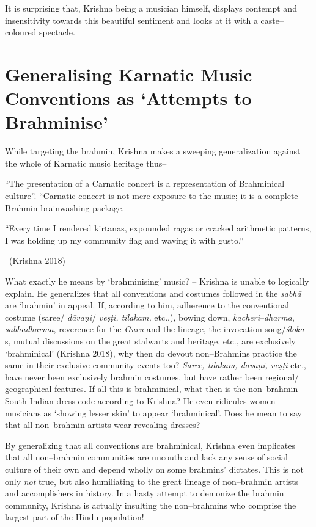 It is surprising that, Krishna being a musician himself, displays contempt and insensitivity towards this beautiful sentiment and looks at it with a caste–coloured spectacle.


\section*{Generalising Karnatic Music Conventions as ‘Attempts to Brahminise’}

While targeting the brahmin, Krishna makes a sweeping generalization against the whole of Karnatic music heritage thus–

\begin{myquote}
“The presentation of a Carnatic concert is a representation of Brahminical culture”. “Carnatic concert is not mere exposure to the music; it is a complete Brahmin brainwashing package.
\end{myquote}

\begin{myquote}
“Every time I rendered kirtanas, expounded ragas or cracked arithmetic patterns, I was holding up my community flag and waving it with gusto.” 

~\hfill (Krishna 2018)
\end{myquote}

What exactly he means by ‘brahminising’ music? – Krishna is unable to logically explain. He generalizes that all conventions and costumes followed in the \textit{sabhā} are ‘brahmin’ in appeal. If, according to him, adherence to the conventional costume (saree/ \textit{dāvaṇi}/ \textit{veṣṭi, tilakam,} etc.,), bowing down, \textit{kacheri}–\textit{dharma}, \textit{sabhā}\textit{dharma}, reverence for the \textit{Guru} and the lineage, the invocation song/\textit{śloka}–s, mutual discussions on the great stalwarts and heritage, etc., are exclusively ‘brahminical’ (Krishna 2018), why then do devout non–Brahmins practice the same in their exclusive community events too? \textit{Saree, tilakam, dāvaṇi, veṣṭi} etc., have never been exclusively brahmin costumes, but have rather been regional/ geographical features. If all this is brahminical, what then is the non–brahmin South Indian dress code according to Krishna? He even ridicules women musicians as ‘showing lesser skin’ to appear ‘brahminical’. Does he mean to say that all non–brahmin artists wear revealing dresses?

By generalizing that all conventions are brahminical, Krishna even implicates that all non–brahmin communities are uncouth and lack any sense of social culture of their own and depend wholly on some brahmins’ dictates. This is not only \textit{not} true, but also humiliating to the great lineage of non–brahmin artists and accomplishers in history. In a hasty attempt to demonize the brahmin community, Krishna is actually insulting the non–brahmins who comprise the largest part of the Hindu population!


